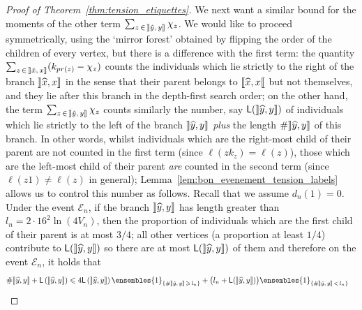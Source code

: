 \documentclass[AHL,Unicode,longabstracts,published]{cedram}
\newcommand{\llbracket}{\mathopen{[\mkern -2.7mu[}}
\newcommand{\rrbracket}{\mathclose{]\mkern -2.7mu]}}
\newcommand{\1}{\ensembles{1}}
\renewcommand{\le}{\leqslant}
\renewcommand{\ge}{\geqslant}
\newcommand{\LL}{\mathsf{L}}
\newcommand{\clE}{\mathcal{E}}
\newcommand{\vertices}{V}
\let\oldhat\hat
\renewcommand*{\hat}[1]{\mathchoice{\widehat{#1}}{\widehat{#1}}{\oldhat{#1}}{\oldhat{#1}}}
\begin{document}
\begin{proof}[Proof of Theorem~\ref{thm:tension_etiquettes}]
We next want a similar bound for the moments of the other term $\sum_{z\,\in\,\mathopen{\rrbracket} \hat{y},\, y \mathclose{\rrbracket}} \chi_{z}$. We would like to proceed symmetrically, using the `mirror forest' obtained by flipping the order of the children of every vertex, but there is a difference with the first term: the quantity $\sum_{z\,\in\,\mathopen{\rrbracket} \hat{x},\,x \mathclose{\rrbracket}} (k_{pr(z)}-\chi_{z})$ counts the individuals which lie strictly to the right of the branch $\mathopen{\rrbracket} \hat{x}, x \mathclose{\rrbracket}$ in the sense that their parent belongs to $\mathopen{\llbracket} \hat{x}, x \mathclose{\llbracket}$ but not themselves, and they lie after this branch in the depth-first search order; on the other hand, the term $\sum_{z\,\in\, \mathopen{\rrbracket} \hat{y},\,y \mathclose{\rrbracket}} \chi_{z}$ counts similarly the number, say $\LL(\mathopen{\rrbracket} \hat{y}, y \mathclose{\rrbracket})$ of individuals which lie strictly to the left of the branch $\mathopen{\rrbracket} \hat{y}, y \mathclose{\rrbracket}$ \emph{plus} the length $\# \mathopen{\rrbracket} \hat{y}, y \mathclose{\rrbracket}$ of this branch. In other words, whilst individuals which are the right-most child of their parent are not counted in the first term (since $\ell(zk_{z}) = \ell(z)$), those which are the left-most child of their parent \emph{are} counted in the second term (since $\ell(z1) \ne \ell(z)$ in general); Lemma~\ref{lem:bon_evenement_tension_labels} allows us to control this number as follows. Recall that we assume $d_{n}(1)=0$. Under the event $\clE_n$, if the branch $\mathopen{\rrbracket} \hat{y}, y \mathclose{\rrbracket}$ has length greater than $l_n = 2\cdot16^{2} \ln(4 \vertices_{n})$, then the proportion of individuals which are the first child of their parent is at most $3/4$; all other vertices (a proportion at least $1/4$) contribute to $\LL(\mathopen{\rrbracket} \hat{y}, y \mathclose{\rrbracket})$ so there are at most $\LL(\mathopen{\rrbracket} \hat{y}, y \mathclose{\rrbracket})$ of them and therefore on the event $\clE_n$, it holds that
\begin{align*}
\# \mathopen{\rrbracket} \hat{y}, y \mathclose{\rrbracket} + \LL\left(\mathopen{\rrbracket} \hat{y}, y \mathclose{\rrbracket}\right) &\le 4 \LL\left(\mathopen{\rrbracket} \hat{y}, y \mathclose{\rrbracket}\right) \1_{\left\{\# \mathopen{\rrbracket} \hat{y},\,y \mathclose{\rrbracket} \,\ge\,l_n\right\}} + \big(l_n + \LL(\mathopen{\rrbracket} \hat{y}, y \mathclose{\rrbracket})\big) \1_{\left\{\# \mathopen{\rrbracket} \hat{y},\,y \mathclose{\rrbracket} \,<\,l_n\right\}}

\end{align*}
\end{proof}
\end{document}
